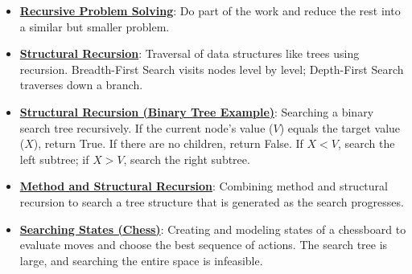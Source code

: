 \documentclass{article}%
\begin{document}
\begin{itemize}[leftmargin=*]%
\item \href{https://purdue.brightspace.com/d2l/common/assets/pdfjs-d2l-dist/1.0.14-legacy/web/viewer.html?file=\%2Fcontent\%2Fenforced\%2F1095467-wl.202510.CS.24300.001\%2F14L1-DepthFS.pdf\%3Fou\%3D1095467\&lang=en-us\&container=d2l-fileviewer-rendered-pdf\&fullscreen=d2l-fileviewer-rendered-pdf-dialog\&height=667#page=4}{\textbf{Recursive Problem Solving}}: Do part of the work and reduce the rest into a similar but smaller problem.%
\item \href{https://purdue.brightspace.com/d2l/common/assets/pdfjs-d2l-dist/1.0.14-legacy/web/viewer.html?file=\%2Fcontent\%2Fenforced\%2F1095467-wl.202510.CS.24300.001\%2F14L1-DepthFS.pdf\%3Fou\%3D1095467\&lang=en-us\&container=d2l-fileviewer-rendered-pdf\&fullscreen=d2l-fileviewer-rendered-pdf-dialog\&height=667#page=8}{\textbf{Structural Recursion}}: Traversal of data structures like trees using recursion. Breadth-First Search visits nodes level by level; Depth-First Search traverses down a branch.%
\item \href{https://purdue.brightspace.com/d2l/common/assets/pdfjs-d2l-dist/1.0.14-legacy/web/viewer.html?file=\%2Fcontent\%2Fenforced\%2F1095467-wl.202510.CS.24300.001\%2F14L1-DepthFS.pdf\%3Fou\%3D1095467\&lang=en-us\&container=d2l-fileviewer-rendered-pdf\&fullscreen=d2l-fileviewer-rendered-pdf-dialog\&height=667#page=10}{\textbf{Structural Recursion (Binary Tree Example)}}: Searching a binary search tree recursively. If the current node's value ($V$) equals the target value ($X$), return True. If there are no children, return False. If $X < V$, search the left subtree; if $X > V$, search the right subtree.%
\item \href{https://purdue.brightspace.com/d2l/common/assets/pdfjs-d2l-dist/1.0.14-legacy/web/viewer.html?file=\%2Fcontent\%2Fenforced\%2F1095467-wl.202510.CS.24300.001\%2F14L1-DepthFS.pdf\%3Fou\%3D1095467\&lang=en-us\&container=d2l-fileviewer-rendered-pdf\&fullscreen=d2l-fileviewer-rendered-pdf-dialog\&height=667#page=11}{\textbf{Method and Structural Recursion}}: Combining method and structural recursion to search a tree structure that is generated as the search progresses.%
\item \href{https://purdue.brightspace.com/d2l/common/assets/pdfjs-d2l-dist/1.0.14-legacy/web/viewer.html?file=\%2Fcontent\%2Fenforced\%2F1095467-wl.202510.CS.24300.001\%2F14L1-DepthFS.pdf\%3Fou\%3D1095467\&lang=en-us\&container=d2l-fileviewer-rendered-pdf\&fullscreen=d2l-fileviewer-rendered-pdf-dialog\&height=667#page=15}{\textbf{Searching States (Chess)}}: Creating and modeling states of a chessboard to evaluate moves and choose the best sequence of actions. The search tree is large, and searching the entire space is infeasible.%

\end{itemize}
\end{document}
